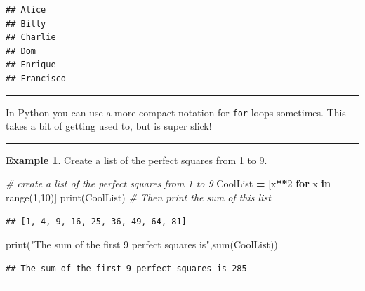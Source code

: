 \documentclass[
]{book}
\newenvironment{Shaded}{\begin{snugshade}}{\end{snugshade}}
\newcommand{\BuiltInTok}[1]{#1}
\newcommand{\CommentTok}[1]{\textcolor[rgb]{0.56,0.35,0.01}{\textit{#1}}}
\newcommand{\ControlFlowTok}[1]{\textcolor[rgb]{0.13,0.29,0.53}{\textbf{#1}}}
\newcommand{\DecValTok}[1]{\textcolor[rgb]{0.00,0.00,0.81}{#1}}
\newcommand{\KeywordTok}[1]{\textcolor[rgb]{0.13,0.29,0.53}{\textbf{#1}}}
\newcommand{\NormalTok}[1]{#1}
\newcommand{\OperatorTok}[1]{\textcolor[rgb]{0.81,0.36,0.00}{\textbf{#1}}}
\newcommand{\StringTok}[1]{\textcolor[rgb]{0.31,0.60,0.02}{#1}}
\theoremstyle{definition}
\theoremstyle{definition}
\newtheorem{example}{Example}[chapter]
\theoremstyle{definition}
\theoremstyle{remark}
\begin{document}
\begin{verbatim}
## Alice
## Billy
## Charlie
## Dom
## Enrique
## Francisco
\end{verbatim}

\begin{center}\rule{0.5\linewidth}{0.5pt}\end{center}

In Python you can use a more compact notation for \texttt{for} loops sometimes. This takes a bit of getting used to, but is super slick!

\begin{center}\rule{0.5\linewidth}{0.5pt}\end{center}

\begin{example}
\protect\hypertarget{exm:unnamed-chunk-659}{}{\label{exm:unnamed-chunk-659} }Create a list of the perfect squares from 1 to 9.
\end{example}

\begin{Shaded}
\begin{Highlighting}[]
\CommentTok{\# create a list of the perfect squares from 1 to 9}
\NormalTok{CoolList }\OperatorTok{=}\NormalTok{ [x}\OperatorTok{**}\DecValTok{2} \ControlFlowTok{for}\NormalTok{ x }\KeywordTok{in} \BuiltInTok{range}\NormalTok{(}\DecValTok{1}\NormalTok{,}\DecValTok{10}\NormalTok{)]}
\BuiltInTok{print}\NormalTok{(CoolList)}
\CommentTok{\# Then print the sum of this list}
\end{Highlighting}
\end{Shaded}

\begin{verbatim}
## [1, 4, 9, 16, 25, 36, 49, 64, 81]
\end{verbatim}

\begin{Shaded}
\begin{Highlighting}[]
\BuiltInTok{print}\NormalTok{(}\StringTok{"The sum of the first 9 perfect squares is"}\NormalTok{,}\BuiltInTok{sum}\NormalTok{(CoolList))}
\end{Highlighting}
\end{Shaded}

\begin{verbatim}
## The sum of the first 9 perfect squares is 285
\end{verbatim}

\begin{center}\rule{0.5\linewidth}{0.5pt}\end{center}
\end{document}
